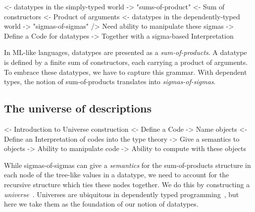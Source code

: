 \begin{wstructure}
<- datatypes in the simply-typed world
    -> "sums-of-product"
        <- Sum of constructors
        <- Product of arguments
<- datatypes in the dependently-typed world
    -> "sigmas-of-sigmas"
    /> Need ability to manipulate these sigmas
        -> Define a Code for datatypes
        -> Together with a sigma-based Interpretation
\end{wstructure}

In ML-like languages, datatypes are presented as a
\emph{sum-of-products}. A datatype is defined by a finite sum of
constructors, each carrying a product of arguments. To embrace
these datatypes, we have to capture this grammar.
With dependent types, the notion of sum-of-products translates into
\emph{sigmas-of-sigmas}.


\subsection{The universe of descriptions}
\label{sec:desc-universe}

\begin{wstructure}
<- Introduction to Universe construction
    <- Define a Code
        -> Name objects
    <- Define an Interpretation of codes into the type theory
        -> Give a semantics to objects
    -> Ability to manipulate code
    -> Ability to compute with these objects
\end{wstructure}

While sigmas-of-sigmas can give a \emph{semantics} for the
sum-of-products structure in each node of the tree-like values in a
datatype, we need to account for the recursive structure which
ties these nodes together. We do this by
constructing a \emph{universe}~\cite{martin-lof:itt}. Universes
are ubiquitous in dependently typed
programming~\cite{benke:universe-generic-prog, oury:power-of-pi},
but here we take them as the foundation of our notion
of datatypes.


